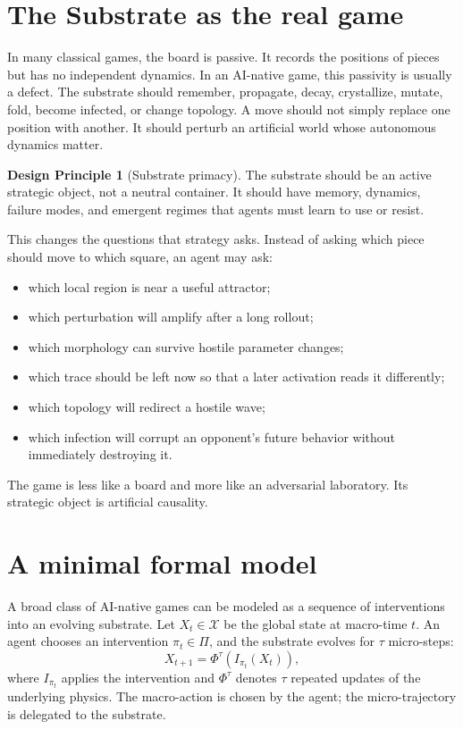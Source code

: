 \documentclass[11pt,a4paper]{article}
\theoremstyle{plain}
\theoremstyle{definition}
\newtheorem{principle}[theorem]{Design Principle}
\newcommand{\X}{\mathcal{X}}
\begin{document}
\section{The Substrate as the real game}\label{sec:substrate}

In many classical games, the board is passive. It records the positions of pieces but has no independent dynamics. In an AI-native game, this passivity is usually a defect. The substrate should remember, propagate, decay, crystallize, mutate, fold, become infected, or change topology. A move should not simply replace one position with another. It should perturb an artificial world whose autonomous dynamics matter.

\begin{principle}[Substrate primacy]\label{prin:substrate-primacy}
The substrate should be an active strategic object, not a neutral container. It should have memory, dynamics, failure modes, and emergent regimes that agents must learn to use or resist.
\end{principle}

This changes the questions that strategy asks. Instead of asking which piece should move to which square, an agent may ask:
\begin{itemize}
  \item which local region is near a useful attractor;
  \item which perturbation will amplify after a long rollout;
  \item which morphology can survive hostile parameter changes;
  \item which trace should be left now so that a later activation reads it differently;
  \item which topology will redirect a hostile wave;
  \item which infection will corrupt an opponent's future behavior without immediately destroying it.
\end{itemize}

The game is less like a board and more like an adversarial laboratory. Its strategic object is artificial causality.

\section{A minimal formal model}\label{sec:model}

A broad class of AI-native games can be modeled as a sequence of interventions into an evolving substrate. Let $X_t\in\X$ be the global state at macro-time $t$. An agent chooses an intervention $\pi_t\in\Pi$, and the substrate evolves for $\tau$ micro-steps:
\[
  X_{t+1} = \Phi^\tau(I_{\pi_t}(X_t)),
\]
where $I_{\pi_t}$ applies the intervention and $\Phi^\tau$ denotes $\tau$ repeated updates of the underlying physics. The macro-action is chosen by the agent; the micro-trajectory is delegated to the substrate.
\end{document}
